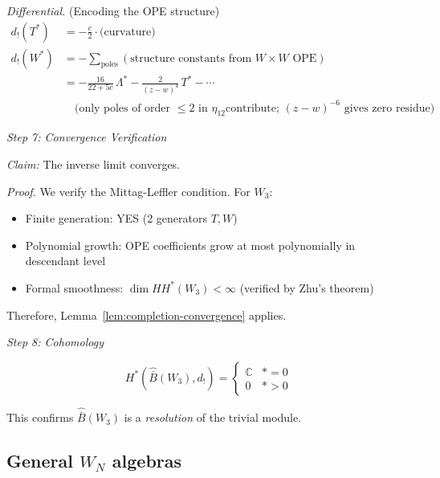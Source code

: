 \begin{example}
\emph{Differential.} (Encoding the OPE structure)
\begin{align*}
d_!(T^*) &= -\frac{c}{2} \cdot \text{(curvature)} \\
d_!(W^*) &= -\sum_{\text{poles}} (\text{structure constants from } W \times W \text{ OPE}) \\
&= -\frac{16}{22+5c}\,\Lambda^* - \frac{2}{(z-w)^4}\,T^* - \cdots \\
& \quad\text{(only poles of order $\leq 2$ in $\eta_{12}$
contribute; $(z{-}w)^{-6}$ gives zero residue)}
\end{align*}

\medskip
\noindent\emph{Step 7: Convergence Verification}

\emph{Claim:} The inverse limit converges.

\emph{Proof.} We verify the Mittag-Leffler condition. For $W_3$:
\begin{itemize}
\item Finite generation: YES (2 generators $T, W$)
\item Polynomial growth: OPE coefficients grow at most polynomially in descendant level
\item Formal smoothness: $\dim HH^*(W_3) < \infty$ (verified by Zhu's theorem)
\end{itemize}

Therefore, Lemma~\ref{lem:completion-convergence} applies.

\medskip
\noindent\emph{Step 8: Cohomology}

\[H^*(\widehat{\bar{B}}(W_3), d_!) = \begin{cases}
\mathbb{C} & * = 0 \\
0 & * > 0
\end{cases}\]

This confirms $\widehat{\bar{B}}(W_3)$ is a \emph{resolution} of the trivial module.
\end{example}


\subsection{\texorpdfstring{General $W_N$ algebras}{General W-N algebras}}

